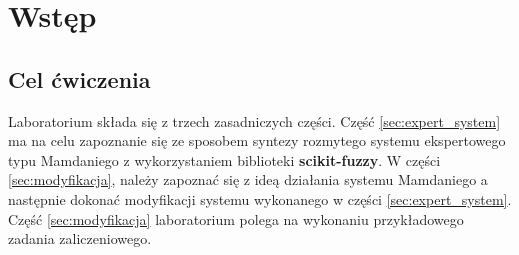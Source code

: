 \section{Wstęp}\label{sec:wstep}
\subsection{Cel ćwiczenia}\label{subsec:cel}

Laboratorium składa się z trzech zasadniczych części. Część \ref{sec:expert_system} ma na celu zapoznanie się ze sposobem syntezy rozmytego systemu ekspertowego typu Mamdaniego z wykorzystaniem biblioteki \textbf{scikit-fuzzy}. W części \ref{sec:modyfikacja}, należy zapoznać się z ideą działania systemu Mamdaniego a następnie dokonać modyfikacji systemu wykonanego w części \ref{sec:expert_system}. Część \ref{sec:modyfikacja} laboratorium polega na wykonaniu przykładowego zadania zaliczeniowego.

